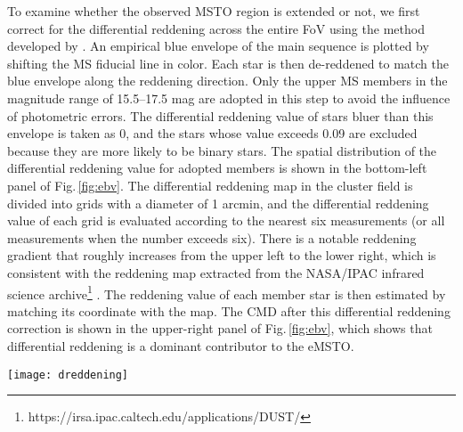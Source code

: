 \documentclass[twocolumn]{aastex631}
\begin{document}
To examine whether the observed MSTO region is extended or not, we first correct for the differential reddening across the entire FoV using the method developed by \citet{2012ApJ...751L...8P, 2013AJ....146...43P}. An empirical blue envelope of the main sequence is plotted by shifting the MS fiducial line in color. Each star is then de-reddened to match the blue envelope along the reddening direction. Only the upper MS members in the magnitude range of 15.5--17.5 mag are adopted in this step to avoid the influence of photometric errors. The differential reddening value of stars bluer than this envelope is taken as 0, and the stars whose value exceeds 0.09 are excluded because they are more likely to be binary stars. The spatial distribution of the differential reddening value for adopted members is shown in the bottom-left panel of Fig.\,\ref{fig:ebv}. The differential reddening map in the cluster field is divided into grids with a diameter of 1 arcmin, and the differential reddening value of each grid is evaluated according to the nearest six measurements (or all measurements when the number exceeds six). There is a notable reddening gradient that roughly increases from the upper left to the lower right, which is consistent with the reddening map extracted from the NASA/IPAC infrared science archive\footnote{https://irsa.ipac.caltech.edu/applications/DUST/} \citep{1998ApJ...500..525S}. The reddening value of each member star is then estimated by matching its coordinate with the map. The CMD after this differential reddening correction is shown in the upper-right panel of Fig.\,\ref{fig:ebv}, which shows that differential reddening is a dominant contributor to the eMSTO. 
\begin{figure*}
	\centering
	\texttt{[image: dreddening]}
	\caption{Upper-left: the original CMD of selected cluster members of NGC 6819. The arrow indicates the reddening direction. The blue box shows the stars used to de-redden and their spatial distribution are plotted in the bottom-left panel.  Upper-right: the CMD corrected for differential reddening. Bottom-right: the differential reddening map in the cluster field with all members overplotted. The color indicates the differential reddening value $\Delta E(\textit{G}_{\rm BP}-\textit{G}_{\rm RP})$. In the corners of this field the estimates are extrapolated due to the lack of cluster members.}
	\label{fig:ebv}
\end{figure*}
\end{document}
